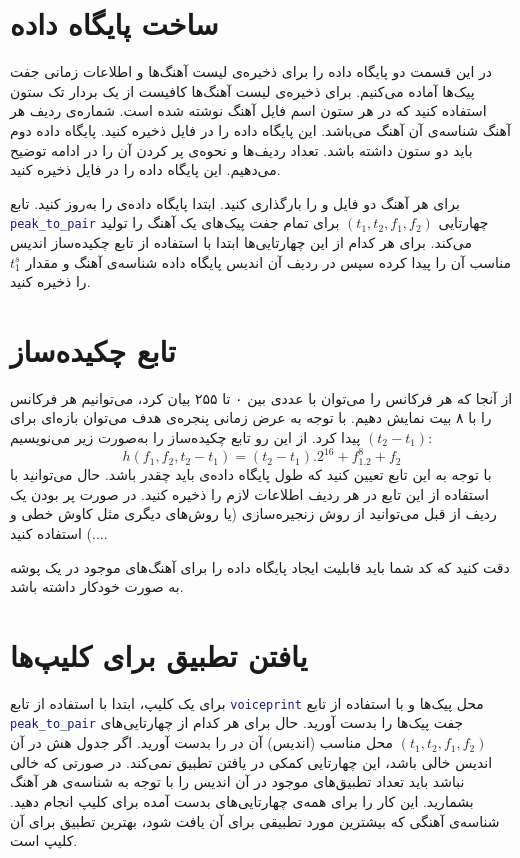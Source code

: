 \documentclass{utsignal}
\begin{document}
	\section{ساخت پایگاه داده}
	در این قسمت دو پایگاه داده را برای ذخیره‌ی لیست آهنگ‌ها و اطلاعات زمانی جفت پیک‌ها آماده می‌کنیم. برای ذخیره‌ی لیست آهنگ‌ها کافیست از یک بردار تک ستون استفاده کنید که در هر ستون اسم فایل آهنگ نوشته شده است. شماره‌ی ردیف هر آهنگ شناسه‌ی آن آهنگ می‌باشد. این پایگاه داده را در فایل  ذخیره کنید. پایگاه داده دوم  باید دو ستون داشته باشد. تعداد ردیف‌ها و نحوه‌ی پر کردن آن را در ادامه توضیح می‌دهیم. این پایگاه داده را در فایل  ذخیره کنید. 
	
	برای هر آهنگ دو فایل  و  را بارگذاری کنید. ابتدا پایگاه داده‌ی  را به‌روز کنید. تابع \lstinline[language=Matlab]{peak_to_pair} چهارتایی $(t_1, t_2, f_1, f_2)$ برای تمام جفت پیک‌های یک آهنگ را تولید می‌کند. برای هر کدام از این چهار‌تایی‌ها ابتدا با استفاده از تابع چکیده‌ساز اندیس  مناسب آن را پیدا کرده سپس در ردیف آن اندیس پایگاه داده  شناسه‌ی آهنگ و مقدار $t_1^s$ را ذخیره کنید.
	
	\section{تابع چکیده‌ساز}
	از آنجا که هر فرکانس را می‌توان با عددی بین ۰ تا ۲۵۵ بیان کرد، می‌توانیم هر فرکانس را با ۸ بیت نمایش دهیم. با توجه‌ به عرض زمانی پنجره‌ی هدف می‌توان بازه‌ای برای $(t_2-t_1)$ پیدا کرد. از این رو تابع چکیده‌ساز را به‌صورت زیر می‌نویسیم:
	$$h(f_1, f_2, t_2-t_1) = (t_2-t_1).2^16 + f_1.2^8 + f_2$$
	با توجه به این تابع تعیین کنید که طول پایگاه داده‌ی  باید چقدر باشد. حال می‌توانید با استفاده از این تابع در هر ردیف اطلاعات لازم را ذخیره کنید. در صورت پر بودن یک ردیف از قبل می‌توانید از روش زنجیره‌سازی (یا روش‌های دیگری مثل کاوش خطی و ...) استفاده کنید.
	
	دقت کنید که کد شما باید قابلیت ایجاد پایگاه‌ داده را برای آهنگ‌های موجود در یک پوشه به صورت خودکار داشته باشد.
	
	\section{یافتن تطبیق برای کلیپ‌ها}
	برای یک کلیپ، ابتدا با استفاده از تابع \lstinline[language=Matlab]{voiceprint} محل پیک‌ها و با استفاده از تابع \lstinline[language=Matlab]{peak_to_pair} جفت پیک‌ها را بدست آورید. حال برای هر کدام از چهارتایی‌های $(t_1, t_2, f_1, f_2)$ محل مناسب (اندیس) آن در  را بدست آورید. اگر جدول هش در آن اندیس خالی باشد، این چهارتایی کمکی در یافتن تطبیق نمی‌کند. در صورتی که خالی نباشد باید تعداد تطبیق‌های موجود در آن اندیس را با توجه به شناسه‌ی هر آهنگ بشمارید. این کار را برای همه‌ی چهارتایی‌های بدست آمده برای کلیپ انجام دهید. شناسه‌ی آهنگی که بیشترین مورد تطبیقی برای آن یافت شود، بهترین تطبیق برای آن کلیپ است.
	
\end{document}
